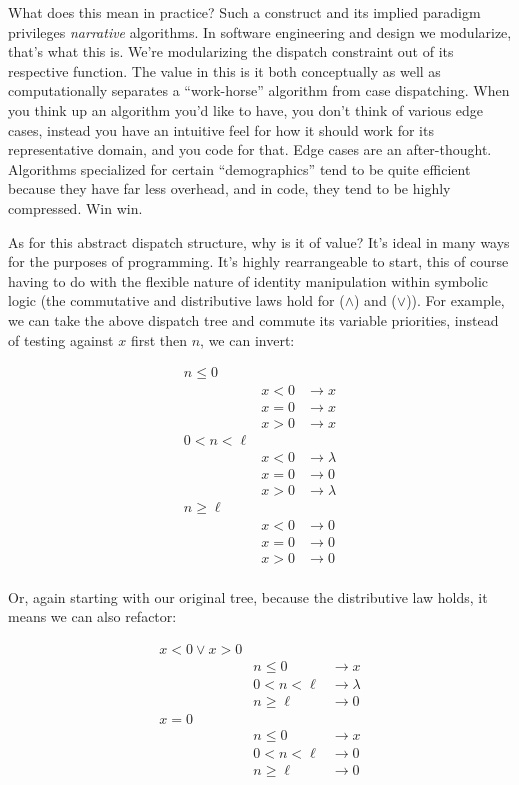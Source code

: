 \documentclass[twoside]{article}
\begin{document}
What does this mean in practice? Such a construct and its implied paradigm privileges \emph{narrative} algorithms.
In software engineering and design we modularize, that's what this is. We're modularizing the dispatch constraint
out of its respective function. The value in this is it both conceptually as well as computationally separates
a ``work-horse'' algorithm from case dispatching. When you think up an algorithm you'd like to have, you don't
think of various edge cases, instead you have an intuitive feel for how it should work for its representative domain,
and you code for that. Edge cases are an after-thought. Algorithms specialized for certain ``demographics'' tend to be
quite efficient because they have far less overhead, and in code, they tend to be highly compressed. Win win.

As for this abstract dispatch structure, why is it of value? It's ideal in many ways for the purposes of programming.
It's highly rearrangeable to start, this of course having to do with the flexible nature of identity manipulation
within symbolic logic (the commutative and distributive laws hold for ($ \wedge $) and ($ \vee $)).
For example, we can take the above dispatch tree and commute its variable priorities, instead of testing against
$ x $ first then $ n $, we can invert:

$$ \begin{array}{r|lr}
n \le 0		& \\
		& x < 0		& \to x		\\
		& x = 0		& \to x		\\
		& x > 0		& \to x		\\
0 < n < \ell	& \\
		& x < 0		& \to \lambda	\\
		& x = 0		& \to 0		\\
		& x > 0		& \to \lambda	\\
n \ge \ell	& \\
		& x < 0		& \to 0		\\
		& x = 0		& \to 0		\\
		& x > 0		& \to 0		\\
\end{array} $$

\newpage

Or, again starting with our original tree, because the distributive law holds, it means we can also refactor:

$$ \begin{array}{r|lr}
x < 0 \vee x > 0	& \\
	& n \le 0	& \to x		\\
	& 0 < n < \ell	& \to \lambda	\\
	& n \ge \ell	& \to 0		\\
x = 0	& \\
	& n \le 0	& \to x		\\
	& 0 < n < \ell	& \to 0		\\
	& n \ge \ell	& \to 0		\\
\end{array} $$
\end{document}
